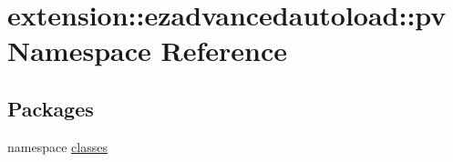\hypertarget{namespaceextension_1_1ezadvancedautoload_1_1pv}{\section{extension\-:\-:ezadvancedautoload\-:\-:pv \-Namespace \-Reference}
\label{namespaceextension_1_1ezadvancedautoload_1_1pv}
}
\subsection*{\-Packages}
\begin{DoxyCompactItemize}
\item 
namespace \hyperlink{namespaceextension_1_1ezadvancedautoload_1_1pv_1_1classes}{classes}
\end{DoxyCompactItemize}
